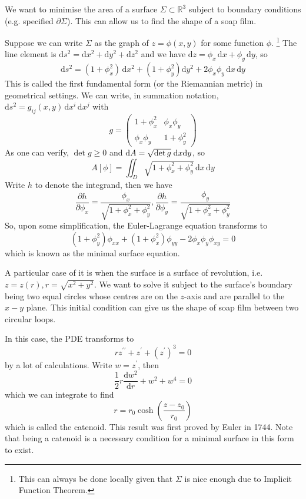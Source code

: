 \documentclass{article}
\begin{document}
\begin{example}
    We want to minimise the area of a surface $\Sigma\subset\mathbb R^3$ subject to boundary conditions (e.g. specified $\partial\Sigma$).
    This can allow us to find the shape of a soap film.

    Suppose we can write $\Sigma$ as the graph of $z=\phi(x,y)$ for some function $\phi$.
    \footnote{This can always be done locally given that $\Sigma$ is nice enough due to Implicit Function Theorem.}
    The line element is $\mathrm ds^2=\mathrm dx^2+\mathrm dy^2+\mathrm dz^2$ and we have $\mathrm dz=\phi_x\,\mathrm dx+\phi_y\,\mathrm dy$, so
    $$\mathrm ds^2=(1+\phi_x^2)\,\mathrm dx^2+(1+\phi_y^2)\mathrm dy^2+2\phi_x\phi_y\,\mathrm dx\,\mathrm dy$$
    This is called the first fundamental form (or the Riemannian metric) in geometrical settings.
    We can write, in summation notation, $\mathrm ds^2=g_{ij}(x,y)\,\mathrm dx^i\,\mathrm dx^j$ with
    $$g=\begin{pmatrix}
            1+\phi_x^2&\phi_x\phi_y\\
            \phi_x\phi_y&1+\phi_y^2
    \end{pmatrix}$$
    As one can verify, $\det g\ge 0$ and $ \mathrm{d} A = \sqrt{\det g}\;\mathrm{d} x\mathrm{d} y $, so
    $$A[\phi]=\iint_D\sqrt{1+\phi_x^2+\phi_y^2}\,\mathrm dx\,\mathrm dy$$
    Write $h$ to denote the integrand, then we have
    $$\frac{\partial h}{\partial\phi_x}=\frac{\phi_x}{\sqrt{1+\phi_x^2+\phi_y^2}},\frac{\partial h}{\partial\phi_y}=\frac{\phi_y}{\sqrt{1+\phi_x^2+\phi_y^2}}$$
    So, upon some simplification, the Euler-Lagrange equation transforms to
    $$(1+\phi_y^2)\phi_{xx}+(1+\phi_x^2)\phi_{yy}-2\phi_x\phi_y\phi_{xy}=0$$
    which is known as the minimal surface equation.

    A particular case of it is when the surface is a surface of revolution, i.e. $z=z(r),r=\sqrt{x^2+y^2}$.
    We want to solve it subject to the surface's boundary being two equal circles whose centres are on the $z$-axis and are parallel to the $x-y$ plane.
    This initial condition can give us the shape of soap film between two circular loops.

    In this case, the PDE transforms to
    $$rz^{\prime\prime}+z^\prime+(z^\prime)^3=0$$
    by a lot of calculations.
    Write $w=z^\prime$, then
    $$\frac{1}{2}r\frac{\mathrm dw^2}{\mathrm dr}+w^2+w^4=0$$
    which we can integrate to find
    $$r=r_0\cosh\left( \frac{z-z_0}{r_0} \right)$$
    which is called the catenoid.
    This result was first proved by Euler in 1744.
    Note that being a catenoid is a necessary condition for a minimal surface in this form to exist.


\end{example}
\end{document}
